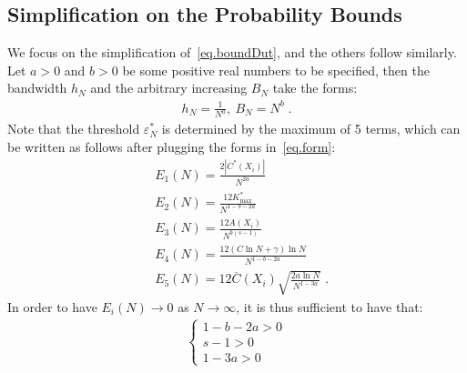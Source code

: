 \documentclass[a4paper,11pt]{article}
\begin{document}
\subsection{Simplification on the Probability Bounds}
We focus on the simplification of~\eqref{eq.boundDut}, and the others follow similarly. Let $a>0$ and $b>0$  be some positive real numbers to be specified, then the bandwidth $h_N$ and the arbitrary increasing $B_N$ take the forms:
\begin{align}
h_N = \frac{1}{N^a},~B_N = N^b\;.	\label{eq.form}
\end{align}
Note that the threshold $\varepsilon^*_N$ is determined by the maximum of 5 terms, which can be written as follows after plugging the forms in~\eqref{eq.form}:
\begin{align}
&E_1(N) = \frac{2|C^*(X_i)|}{N^{2a}}\\
&E_2(N) = \frac{12K_{\max}^*}{N^{1-b-2a}}\\
&E_3(N) = \frac{12A(X_i)}{N^{b(s-1)}}	\\
&E_4(N) =\frac{12(C\ln N+\gamma)\ln N}{N^{1-b-2a}}\label{eq.gamma}\\
&E_5(N) = 12\overline{C}(X_i)\sqrt{\frac{2a\ln N}{N^{1-3a}}}\;.
\end{align}
In order to have $E_i(N)\to 0$ as $N\to\infty$, it is thus sufficient to have that:
\begin{align}
\begin{cases}
	1-b-2a>0\\
s-1>0\\
	1-3a>0
\end{cases}	
\end{align}
\end{document}
